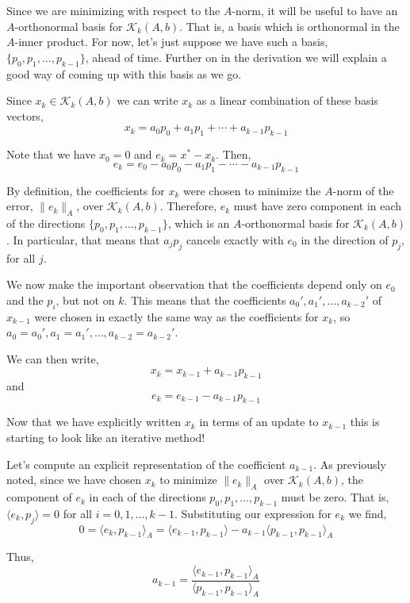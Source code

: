 \documentclass[10pt]{article}
\begin{document}
Since we are minimizing with respect to the \(A\)-norm, it will be useful to have an \(A\)-orthonormal basis for \(\mathcal{K}_k(A,b)\).
That is, a basis which is orthonormal in the \(A\)-inner product.
For now, let's just suppose we have such a basis, \(\{p_0,p_1,\ldots,p_{k-1}\}\), ahead of time.
Further on in the derivation we will explain a good way of coming up with this basis as we go.

Since \(x_k\in\mathcal{K}_k(A,b)\) we can write \(x_k\) as a linear combination of these basis vectors,
\[
x_k = a_0 p_0 + a_1 p_1 + \cdots + a_{k-1} p_{k-1}
\]

Note that we have \(x_0 = 0\) and \(e_k = x^* - x_k\).
Then,
\[
e_k = e_0 - a_0p_0 - a_1 p_1 - \cdots - a_{k-1} p_{k-1}
\]

By definition, the coefficients for \(x_k\) were chosen to minimize the \(A\)-norm of the error, \(\|e_k\|_A\), over \(\mathcal{K}_k(A,b)\).
Therefore, \(e_k\) must have zero component in each of the directions \(\{ p_0,p_1,\ldots,p_{k-1} \}\), which is an \(A\)-orthonormal basis for \(\mathcal{K}_k(A,b)\).
In particular, that means that \(a_jp_j\) cancels exactly with \(e_0\) in the direction of \(p_j\), for all \(j\).

We now make the important observation that the coefficients depend only on \(e_0\) and the \(p_i\), but not on \(k\).
This means that the coefficients \(a_0',a_1',\ldots,a_{k-2}'\) of \(x_{k-1}\) were chosen in exactly the same way as the coefficients for \(x_k\), so \(a_0=a_0', a_1=a_1', \ldots, a_{k-2}=a_{k-2}'\).

We can then write,
\[
x_k = x_{k-1} + a_{k-1} p_{k-1}
\]
and
\[
e_k = e_{k-1} - a_{k-1} p_{k-1}
\]

Now that we have explicitly written \(x_k\) in terms of an update to \(x_{k-1}\) this is starting to look like an iterative method!

Let's compute an explicit representation of the coefficient \(a_{k-1}\).
As previously noted, since we have chosen \(x_k\) to minimize \(\|e_k\|_A\) over \(\mathcal{K}_k(A,b)\), the component of \(e_k\) in each of the directions \(p_0,p_1,\ldots,p_{k-1}\) must be zero.
That is, \(\langle e_k , p_j \rangle = 0\) for all \(i=0,1,\ldots, k-1\). Substituting our expression for \(e_k\) we find,
\[
0 = \langle e_k , p_{k-1} \rangle_A
= \langle e_{k-1}, p_{k-1} \rangle - a_{k-1} \langle p_{k-1} , p_{k-1} \rangle_A
\]

Thus,
\[
a_{k-1} 
= \frac{\langle e_{k-1}, p_{k-1} \rangle_A}{\langle p_{k-1},p_{k-1} \rangle_A} 
\]
\end{document}
